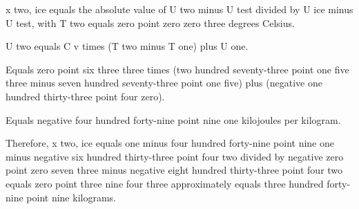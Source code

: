 x two, ice equals the absolute value of U two minus U test divided by U ice minus U test, with T two equals zero point zero zero three degrees Celsius.

U two equals C v times (T two minus T one) plus U one.

Equals zero point six three three times (two hundred seventy-three point one five three minus seven hundred seventy-three point one five) plus (negative one hundred thirty-three point four zero).

Equals negative four hundred forty-nine point nine one kilojoules per kilogram.

Therefore, x two, ice equals one minus four hundred forty-nine point nine one minus negative six hundred thirty-three point four two divided by negative zero point zero seven three minus negative eight hundred thirty-three point four two equals zero point three nine four three approximately equals three hundred forty-nine point nine kilograms.